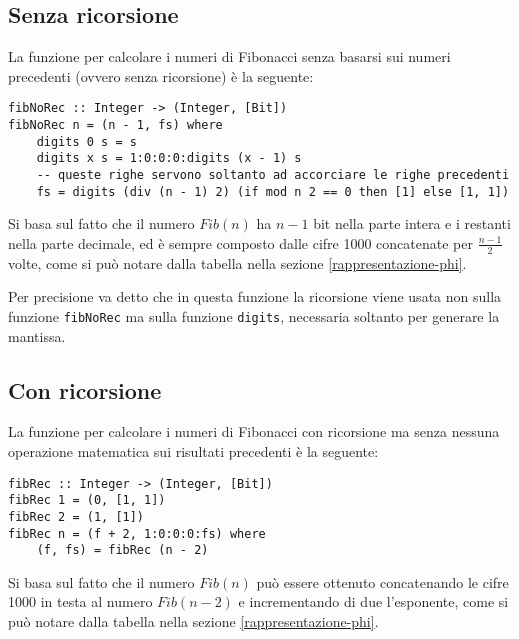 \documentclass[Lau]{sapthesis}
\newcommand{\code}[1]{\colorbox{light-gray}{\texttt{#1}}}
\begin{document}
\subsection{Senza ricorsione}
La funzione per calcolare i numeri di Fibonacci senza basarsi sui numeri precedenti (ovvero senza ricorsione) è la seguente:
\begin{verbatim}
fibNoRec :: Integer -> (Integer, [Bit])
fibNoRec n = (n - 1, fs) where
    digits 0 s = s
    digits x s = 1:0:0:0:digits (x - 1) s
    -- queste righe servono soltanto ad accorciare le righe precedenti
    fs = digits (div (n - 1) 2) (if mod n 2 == 0 then [1] else [1, 1])
\end{verbatim}
Si basa sul fatto che il numero $Fib(n)$ ha $n-1$ bit nella parte intera e i restanti nella parte decimale, ed è sempre composto dalle cifre 1000 concatenate per $\frac{n-1}{2}$ volte, come si può notare dalla tabella nella sezione \ref{rappresentazione-phi}.

Per precisione va detto che in questa funzione la ricorsione viene usata non sulla funzione \code{fibNoRec} ma sulla funzione \code{digits}, necessaria soltanto per generare la mantissa.


\subsection{Con ricorsione}
La funzione per calcolare i numeri di Fibonacci con ricorsione ma senza nessuna operazione matematica sui risultati precedenti è la seguente:
\begin{verbatim}
fibRec :: Integer -> (Integer, [Bit])
fibRec 1 = (0, [1, 1])
fibRec 2 = (1, [1])
fibRec n = (f + 2, 1:0:0:0:fs) where
    (f, fs) = fibRec (n - 2)
\end{verbatim}
Si basa sul fatto che il numero $Fib(n)$ può essere ottenuto concatenando le cifre 1000 in testa al numero $Fib(n-2)$ e incrementando di due l'esponente, come si può notare dalla tabella nella sezione \ref{rappresentazione-phi}.



\backmatter
\cleardoublepage
{}
{}


\end{document}
